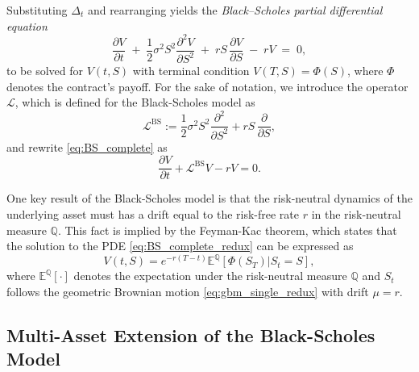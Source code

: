 \documentclass[12pt]{report} %
\theoremstyle{plain}           %
\theoremstyle{definition}      %
\theoremstyle{remark}          %
\begin{document}
Substituting $\Delta_t$ and rearranging yields the
\emph{Black--Scholes partial differential equation}
\begin{equation}
\boxed{
\frac{\partial V}{\partial t}
\;+\;
\frac{1}{2}\sigma^{2}S^{2}\frac{\partial^{2}V}{\partial S^{2}}
\;+\;
rS\,\frac{\partial V}{\partial S}
\;-\;
rV
\;=\;0,
}\label{eq:BS_complete}
\end{equation}
to be solved for $V(t,S)$ with terminal condition
$V(T,S)=\Phi(S)$, where $\Phi$ denotes the contract’s payoff. For the sake of notation,
we introduce the operator $\mathcal{L}$, which is defined for the Black-Scholes model as
\begin{equation}\label{eq:L_BS}
\mathcal{L}^{\mathrm{BS}}
:= \frac{1}{2}\sigma^{2}S^{2}\frac{\partial^{2}}{\partial S^{2}}
	+ rS\,\frac{\partial }{\partial S},
\end{equation}
and rewrite \eqref{eq:BS_complete} as
\begin{equation}\label{eq:BS_complete_redux}
\frac{\partial V}{\partial t}+\mathcal{L}^{\mathrm{BS}}V-rV=0.
\end{equation}

One key result of the Black-Scholes model is that the risk-neutral dynamics of the underlying asset
must has a drift equal to the risk-free rate $r$ in the risk-neutral measure $\mathbb{Q}$. This fact is implied by the
Feyman-Kac theorem, which states that the solution to the PDE \eqref{eq:BS_complete_redux} can be expressed as
\begin{equation}\label{eq:FK_solution}
V(t,S) = e^{-r(T-t)}\mathbb{E}^{\mathbb{Q}}[\Phi(S_T)|S_t=S],
\end{equation}
where $\mathbb{E}^{\mathbb{Q}}[\cdot]$ denotes the expectation under the risk-neutral measure $\mathbb{Q}$ and $S_t$ follows the
geometric Brownian motion \eqref{eq:gbm_single_redux} with drift $\mu=r$.


\subsection{Multi-Asset Extension of the Black-Scholes Model}\label{sec:multiasset}
\end{document}
